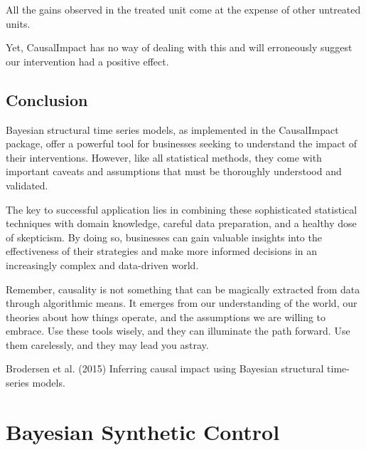 \documentclass[
  letterpaper,
  DIV=11,
  numbers=noendperiod]{scrreprt}
\begin{document}
All the gains observed in the treated unit come at the expense of other
untreated units.

Yet, CausalImpact has no way of dealing with this and will erroneously
suggest our intervention had a positive effect.

\section{Conclusion}\label{conclusion-3}

Bayesian structural time series models, as implemented in the
CausalImpact package, offer a powerful tool for businesses seeking to
understand the impact of their interventions. However, like all
statistical methods, they come with important caveats and assumptions
that must be thoroughly understood and validated.

The key to successful application lies in combining these sophisticated
statistical techniques with domain knowledge, careful data preparation,
and a healthy dose of skepticism. By doing so, businesses can gain
valuable insights into the effectiveness of their strategies and make
more informed decisions in an increasingly complex and data-driven
world.

Remember, causality is not something that can be magically extracted
from data through algorithmic means. It emerges from our understanding
of the world, our theories about how things operate, and the assumptions
we are willing to embrace. Use these tools wisely, and they can
illuminate the path forward. Use them carelessly, and they may lead you
astray.

\begin{tcolorbox}[enhanced jigsaw, colframe=quarto-callout-tip-color-frame, left=2mm, toprule=.15mm, colbacktitle=quarto-callout-tip-color!10!white, title=\textcolor{quarto-callout-tip-color}{\faLightbulb}\hspace{0.5em}{Learn more}, coltitle=black, rightrule=.15mm, leftrule=.75mm, colback=white, arc=.35mm, bottomtitle=1mm, bottomrule=.15mm, breakable, titlerule=0mm, opacitybacktitle=0.6, toptitle=1mm, opacityback=0]

Brodersen et al. (2015) Inferring causal impact using Bayesian
structural time-series models.

\end{tcolorbox}

\chapter{Bayesian Synthetic Control}\label{bayesian-synthetic-control}
\end{document}
